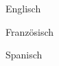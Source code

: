 


	{\begin{cvenumerate}
		\item Englisch 
		\item Französisch 
		\item Spanisch 
	\end{cvenumerate}}
